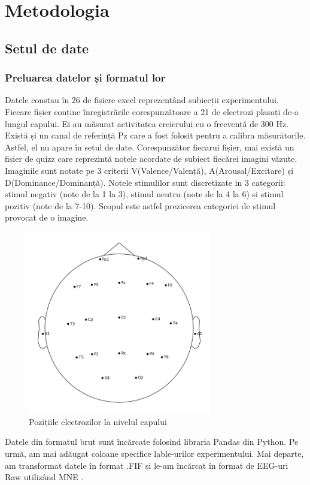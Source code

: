 
\def\totalEpoci{0}
\def\totalEpociTestare{0}
\def\totalEpociValentaPozitiva{0}
\def\totalEpociValentaNegativa{0}
\def\totalEpociValentaNeutra{0}
\def\crestereAcurateteAutoReject{0}
\def\nrParticipantiAntrenare{0}
\def\nrParticipantiValidare{0}
\def\nrParticipantiTestare{0}

\chapter{Metodologia}

\section{Setul de date}
\subsection{Preluarea datelor și formatul lor}
Datele constau în 26 de fișiere excel reprezentând subiecții experimentului. Fiecare fișier conține înregistrările corespunzătoare a 21 de electrozi plasați de-a lungul capului. Ei au măsurat activitatea creierului cu o frecvență de 300 Hz. Există și un canal de referință Pz care a fost folosit pentru a calibra măsurătorile. Astfel, el nu apare în setul de date. Corespunzător fiecarui fișier, mai există un fișier de quizz care reprezintă notele acordate de subiect fiecărei imagini văzute. Imaginile sunt notate pe 3 criterii V(Valence/Valență), A(Arousal/Excitare) și D(Dominance/Dominanță). Notele stimulilor sunt discretizate in 3 categorii: stimul negativ (note de la 1 la 3), stimul neutru (note de la 4 la 6) și stimul pozitiv (note de la 7-10). Scopul este astfel prezicerea categoriei de stimul provocat de o imagine.
\setlength{\abovecaptionskip}{0pt}
\setlength{\belowcaptionskip}{0pt}
\clearpage
\begin{figure}[h]
    \centering
    \includegraphics[width=8cm]{images/Sensor_positions_(eeg).png}
    \caption{Pozițiile electrozilor la nivelul capului}
    \label{fig:sensor_positions}
\end{figure}
Datele din formatul brut sunt încărcate folosind libraria Pandas \cite{reback2020pandas} din Python. Pe urmă, am mai adăugat coloane specifice lable-urilor experimentului. Mai departe, am transformat datele în format .FIF și le-am încărcat în format de EEG-uri Raw utilizând MNE \cite{MNE}.

